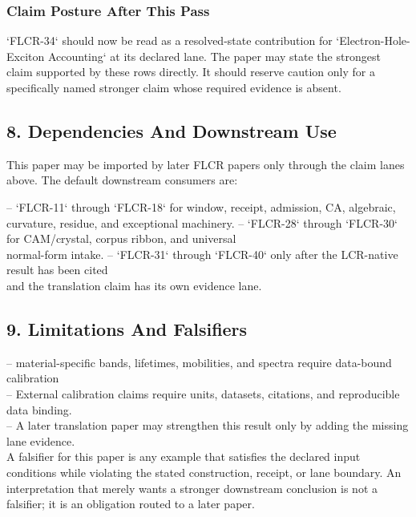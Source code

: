 \documentclass[11pt]{article}
\begin{document}
\subsubsection*{Claim Posture After This Pass}

`FLCR-34` should now be read as a resolved-state contribution for `Electron-Hole-Exciton Accounting` at its declared lane. The paper may state the strongest claim supported by these rows directly. It should reserve caution only for a specifically named stronger claim whose required evidence is absent.

\subsection*{8. Dependencies And Downstream Use}

This paper may be imported by later FLCR papers only through the claim lanes
above. The default downstream consumers are:

\noindent{}-- `FLCR-11` through `FLCR-18` for window, receipt, admission, CA, algebraic,\\
  curvature, residue, and exceptional machinery.
\noindent{}-- `FLCR-28` through `FLCR-30` for CAM/crystal, corpus ribbon, and universal\\
  normal-form intake.
\noindent{}-- `FLCR-31` through `FLCR-40` only after the LCR-native result has been cited\\
  and the translation claim has its own evidence lane.

\subsection*{9. Limitations And Falsifiers}

\noindent{}-- material-specific bands, lifetimes, mobilities, and spectra require data-bound calibration\\
\noindent{}-- External calibration claims require units, datasets, citations, and reproducible data binding.\\
\noindent{}-- A later translation paper may strengthen this result only by adding the missing lane evidence.\\

A falsifier for this paper is any example that satisfies the declared input
conditions while violating the stated construction, receipt, or lane boundary.
An interpretation that merely wants a stronger downstream conclusion is not a
falsifier; it is an obligation routed to a later paper.
\end{document}
